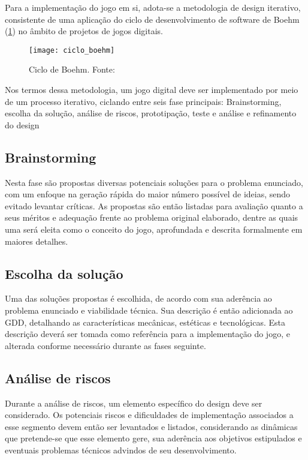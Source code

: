 Para a implementação do jogo em si, adota-se a metodologia de design iterativo, consistente de uma aplicação do ciclo de desenvolvimento de software de Boehm (\ref{fig:ciclo-boehm}) no âmbito de projetos de jogos digitais.

\begin{figure}[ht]
	\centering
	\texttt{[image: ciclo\_boehm]}
	\caption{Ciclo de Boehm. Fonte: \cite{schell:2010:art_game_design}}
	\label{fig:ciclo-boehm}
\end{figure}

Nos termos dessa metodologia, um jogo digital deve ser implementado por meio de um processo iterativo, ciclando entre seis fase principais: Brainstorming, escolha da solução, análise de riscos, prototipação, teste e análise e refinamento do design

\subsection{Brainstorming}\label{subsec-met-brainstorming}

Nesta fase são propostas diversas potenciais soluções para o problema enunciado, com um enfoque na geração rápida do maior número possível de ideias, sendo evitado levantar críticas. As propostas são então listadas para avaliação quanto a seus méritos e adequação frente ao problema original elaborado, dentre as quais uma será eleita como o conceito do jogo, aprofundada e descrita formalmente em maiores detalhes.

\subsection{Escolha da solução}\label{subsec-met-escolha-solucao}

Uma das soluções propostas é escolhida, de acordo com sua aderência ao problema enunciado e viabilidade técnica. Sua descrição é então adicionada ao GDD, detalhando as características mecânicas, estéticas e tecnológicas. Esta descrição deverá ser tomada como referência para a implementação do jogo, e alterada conforme necessário durante as fases seguinte.

\subsection{Análise de riscos}\label{subsec-met-analise-riscos}

Durante a análise de riscos, um elemento específico do design deve ser considerado. Os potenciais riscos e dificuldades de implementação associados a esse segmento devem então ser levantados e listados, considerando as dinâmicas que pretende-se que esse elemento gere, sua aderência aos objetivos estipulados e eventuais problemas técnicos advindos de seu desenvolvimento.

